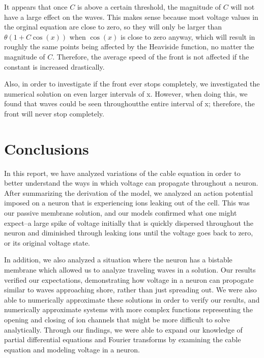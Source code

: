 \documentclass[12pt]{article}
\begin{document}
It appears that once $C$ is above a certain threshold, the magnitude of $C$ will not have a large effect on the waves. This makes sense because most voltage values in the orginal equation are close to zero, so they will only be larger than $\theta(1+C\cos(x))$ when $\cos(x)$ is close to zero anyway, which will result in roughly the same points being affected by the Heaviside function, no matter the magnitude of $C$. Therefore, the average speed of the front is not affected if the constant is increased drastically. \par
Also, in order to investigate if the front ever stops completely, we investigated the numerical solution on even larger intervals of x. However, when doing this, we found that waves could be seen throughoutthe entire interval of x; therefore, the front will never stop completely. 

\section{Conclusions}
In this report, we have analyzed variations of the cable equation in order to better understand the ways in which voltage can propagate throughout a neuron. After summarizing the derivation of the model, we analyzed an action potential imposed on a neuron that is experiencing ions leaking out of the cell. This was our passive membrane solution, and our models confirmed what one might expect--a large spike of voltage initially that is quickly dispersed throughout the neuron and diminished through leaking ions until the voltage goes back to zero, or its original voltage state. \par
In addition, we also analyzed a situation where the neuron has a bistable membrane which allowed us to analyze traveling waves in a solution. Our results verified our expectations, demonstrating how voltage in a neuron can propogate similar to waves approaching shore, rather than just spreading out. We were also able to numerically approximate these solutions in order to verify our results, and numerically approximate systems with more complex functions representing the opening and closing of ion channels that might be more difficult to solve analytically. Through our findings, we were able to expand our knowledge of partial differential equations and Fourier transforms by examining the cable equation and modeling voltage in a neuron. 


\pagebreak
\end{document}
